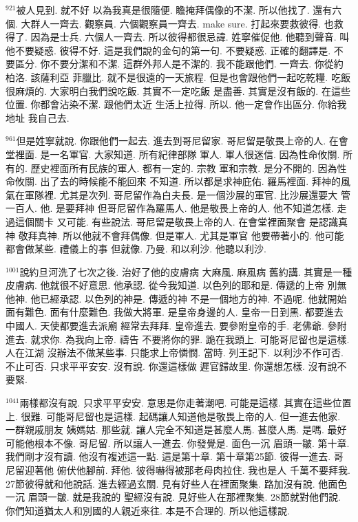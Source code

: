 \documentclass{book}
\begin{document}
$^{921}$被人見到.
就不好 以為我真是很隨便.
瞻掩拜偶像的不潔.
所以他找了.
還有六個.
大群人一齊去.
觀察員.
六個觀察員一齊去.
make sure.
打起來要救彼得.
也救得了.
因為是士兵.
六個人一齊去.
所以彼得都很忌諱.
姓寧催促他.
他聽到聲音.
叫他不要疑惑.
彼得不好.
這是我們說的金句的第一句.
不要疑惑.
正確的翻譯是.
不要區分.
你不要分潔和不潔.
這群外邦人是不潔的.
我不能跟他們.
一齊去.
你從約柏洛.
該薩利亞 菲臘比.
就不是很遠的一天旅程.
但是也會跟他們一起吃乾糧.
吃飯 很麻煩的.
大家明白我們說吃飯.
其實不一定吃飯 是盡善.
其實是沒有飯的.
在這些位置.
你都會沾染不潔.
跟他們太近 生活上拉得.
所以.
他一定會作出區分.
你給我地址 我自己去.

$^{961}$但是姓寧就說.
你跟他們一起去.
進去到哥尼留家.
哥尼留是敬畏上帝的人.
在會堂裡面.
是一名軍官.
大家知道.
所有紀律部隊 軍人.
軍人很迷信.
因為性命攸關.
所有的.
歷史裡面所有民族的軍人.
都有一定的.
宗教 軍和宗教.
是分不開的.
因為性命攸關.
出了去的時候能不能回來 不知道.
所以都是求神庇佑.
羅馬裡面.
拜神的風氣在軍隊裡.
尤其是次列.
哥尼留作為白夫長.
是一個沙展的軍官.
比沙展還要大 管一百人.
他.
是要拜神 但哥尼留作為羅馬人.
他是敬畏上帝的人.
他不知道怎樣.
走過這個關卡 又可能.
有些說法.
哥尼留是敬畏上帝的人.
在會堂裡面聚會 是認識真神 敬拜真神.
所以他就不會拜偶像.
但是軍人.
尤其是軍官 他要帶著小的.
他可能都會做某些.
禮儀上的事 但就像.
乃曼.
和以利沙.
他聽以利沙.

$^{1001}$說約旦河洗了七次之後.
治好了他的皮膚病 大麻風.
麻風病 舊約講.
其實是一種皮膚病.
他就很不好意思.
他承認.
從今我知道.
以色列的耶和是.
傳遞的上帝 別無他神.
他已經承認.
以色列的神是.
傳遞的神 不是一個地方的神.
不過呢.
他就開始面有難色.
面有什麼難色.
我做大將軍.
是皇帝身邊的人.
皇帝一日到黑.
都要進去 中國人.
天使都要進去派廟 經常去拜拜.
皇帝進去.
要參附皇帝的手.
老佛爺.
參附進去.
就求你.
為我向上帝.
禱告 不要將你的罪.
跪在我頭上.
可能哥尼留也是這樣.
人在江湖 沒辦法不做某些事.
只能求上帝憐憫.
當時.
列王記下.
以利沙不作可否.
不止可否.
只求平平安安.
沒有說.
你還這樣做 遲官歸故里.
你還想怎樣.
沒有說不要緊.

$^{1041}$兩樣都沒有說.
只求平平安安.
意思是你走著潮吧.
可能是這樣.
其實在這些位置上.
很難.
可能哥尼留也是這樣.
起碼讓人知道他是敬畏上帝的人.
但一進去他家.
一群親戚朋友 姨媽姑.
那些就.
讓人完全不知道是甚麼人馬.
甚麼人馬.
是嗎.
最好可能他根本不像.
哥尼留.
所以讓人一進去.
你發覺是.
面色一沉 眉頭一皺.
第十章.
我們剛才沒有讀.
他沒有複述這一點.
這是第十章.
第十章第25節.
彼得一進去.
哥尼留迎著他 俯伏他腳前.
拜他.
彼得嚇得被那老母肉拉住.
我也是人 千萬不要拜我.
27節彼得就和他說話.
進去經過玄關.
見有好些人在裡面聚集.
路加沒有說.
他面色一沉 眉頭一皺.
就是我說的 聖經沒有說.
見好些人在那裡聚集.
28節就對他們說.
你們知道猶太人和別國的人親近來往.
本是不合理的.
所以他這樣說.
\end{document}
